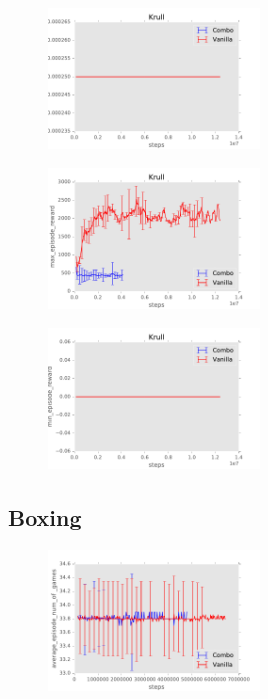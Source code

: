 \documentclass{sig-alternate}
\begin{document}
\begin{figure}
    \centering
    \includegraphics[width=0.5\textwidth]{../results/Krull/Comparisons/Combo/Combo-baseline-learning_rate.pdf}
\end{figure}


\begin{figure}
    \centering
    \includegraphics[width=0.5\textwidth]{../results/Krull/Comparisons/Combo/Combo-baseline-max_episode_reward.pdf}
\end{figure}


\begin{figure}
    \centering
    \includegraphics[width=0.5\textwidth]{../results/Krull/Comparisons/Combo/Combo-baseline-min_episode_reward.pdf}
\end{figure}
\FloatBarrier

\subsection{Boxing}\label{Appendix boxing prior}

\begin{figure}
    \centering
    \includegraphics[width=0.5\textwidth]{../results/Boxing/Comparisons/Combo/Combo-baseline-average_episode_num_of_games.pdf}
\end{figure}
\end{document}
